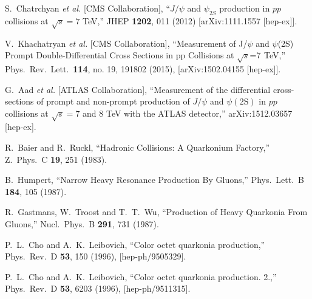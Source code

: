 \documentclass[aps,prc,preprint,superscriptaddress,showpacs,showkeys,amsmath]{revtex4-1}
\begin{document}
\begin{thebibliography}{100}
  S.~Chatrchyan {\it et al.} [CMS Collaboration],
  ``$J/\psi$ and $\psi_{2S}$ production in $pp$ collisions at $\sqrt{s}=7$ TeV,''
  JHEP {\bf 1202}, 011 (2012)
  [arXiv:1111.1557 [hep-ex]].


  V.~Khachatryan {\it et al.} [CMS Collaboration],
  ``Measurement of J/$\psi$ and $\psi$(2S) Prompt Double-Differential Cross Sections in pp Collisions at $\sqrt{s}$=7  TeV,''
  Phys.\ Rev.\ Lett.\  {\bf 114}, no. 19, 191802 (2015),
  [arXiv:1502.04155 [hep-ex]].


%
  G.~Aad {\it et al.} [ATLAS Collaboration],
  ``Measurement of the differential cross-sections of prompt and non-prompt production of $J/\psi$ 
  and $\psi(2\mathrm{S})$ in $pp$ collisions at $\sqrt{s} = 7$ and $8$ TeV with the ATLAS detector,''
  arXiv:1512.03657 [hep-ex].




%
  R.~Baier and R.~Ruckl,
  ``Hadronic Collisions: A Quarkonium Factory,''
  Z.\ Phys.\ C {\bf 19}, 251 (1983).


  B.~Humpert,
  ``Narrow Heavy Resonance Production By Gluons,''
  Phys.\ Lett.\ B {\bf 184}, 105 (1987).



  R.~Gastmans, W.~Troost and T.~T.~Wu,
  ``Production of Heavy Quarkonia From Gluons,''
  Nucl.\ Phys.\ B {\bf 291}, 731 (1987).



  P.~L.~Cho and A.~K.~Leibovich,
  ``Color octet quarkonia production,''
  Phys.\ Rev.\ D {\bf 53}, 150 (1996),
  [hep-ph/9505329].

  P.~L.~Cho and A.~K.~Leibovich,
  ``Color octet quarkonia production. 2.,''
  Phys.\ Rev.\ D {\bf 53}, 6203 (1996),
  [hep-ph/9511315].


\end{thebibliography}
\end{document}

